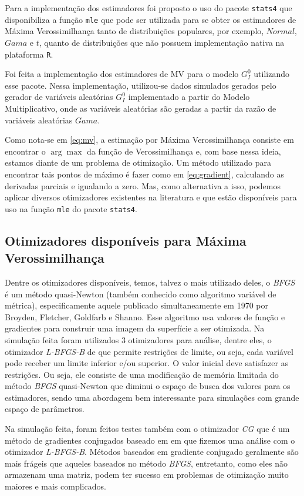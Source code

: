 \documentclass[12pt]{article}
\begin{document}
Para a implementação dos estimadores foi proposto o uso do pacote \texttt{stats4} que disponibiliza a função \texttt{mle} que pode ser utilizada para se obter os estimadores de Máxima Verossimilhança tanto de distribuições populares, por exemplo, $Normal$, $Gama$ e $t$, quanto de distribuições que não possuem implementação nativa na plataforma \texttt{R}.

Foi feita a implementação dos estimadores de MV para o modelo $G_I^0$ utilizando esse pacote. Nessa implementação, utilizou-se dados simulados gerados pelo gerador de variáveis aleatórias $G_I^0$ implementado a partir do Modelo Multiplicativo, onde as variáveis aleatórias são geradas a partir da razão de variáveis aleatórias $Gama$.

Como nota-se em \eqref{eq:mv}, a estimação por Máxima Verossimilhança consiste em encontrar o $\arg\max$ da função de Verossimilhança e, com base nessa ideia, estamos diante de um problema de otimização. Um método utilizado para encontrar tais pontos de máximo é fazer como em \eqref{eq:gradient}, calculando as derivadas parciais e igualando a zero. Mas, como alternativa a isso, podemos aplicar diversos otimizadores existentes na literatura e que estão disponíveis para uso na função \texttt{mle} do pacote \texttt{stats4}.

\subsection{Otimizadores disponíveis para Máxima Verossimilhança}

Dentre os otimizadores disponíveis, temos, talvez o mais utilizado deles, o \emph{BFGS} é um método quasi-Newton (também conhecido como algoritmo variável de métrica), especificamente aquele publicado simultaneamente em 1970 por Broyden, Fletcher, Goldfarb e Shanno. Esse algoritmo usa valores de função e gradientes para construir uma imagem da superfície a ser otimizada. Na simulação feita foram utilizados 3 otimizadores para análise, dentre eles, o otimizador \emph{L-BFGS-B} de \citet{Byrd_1995} que permite restrições de limite, ou seja, cada variável pode receber um limite inferior e/ou superior. O valor inicial deve satisfazer as restrições. Ou seja, ele consiste de uma modificação de memória limitada do método \emph{BFGS} quasi-Newton que diminui o espaço de busca dos valores para os estimadores, sendo uma abordagem bem interessante para simulações com grande espaço de parâmetros.

Na simulação feita, foram feitos testes também com o otimizador \emph{CG} que é um método de gradientes conjugados baseado em \citet{Fletcher64} em que fizemos uma análise com o otimizador \emph{L-BFGS-B}. Métodos baseados em gradiente conjugado geralmente são mais frágeis que aqueles baseados no método \emph{BFGS}, entretanto, como eles não armazenam uma matriz, podem ter sucesso em problemas de otimização muito maiores e mais complicados.
\end{document}
